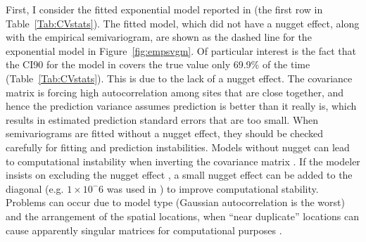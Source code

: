 \documentclass[11pt, titlepage]{article}\usepackage[]{graphicx}\usepackage[]{color}
\begin{document}
\begin{spacing}{1.9}
\begin{flushleft}
First, I consider the fitted exponential model reported in \citet{Ladl:Avga:Whea:Boyc:pred:2016} (the first row in Table~\ref{Tab:CVstats}).  The fitted model, which did not have a nugget effect, along with the empirical semivariogram, are shown as the dashed line for the exponential model in Figure~\ref{fig:empsvgm}.  Of particular interest is the fact that the CI90 for the model in \citet{Ladl:Avga:Whea:Boyc:pred:2016} covers the true value only 69.9\% of the time (Table~\ref{Tab:CVstats}). This is due to the lack of a nugget effect. The covariance matrix is forcing high autocorrelation among sites that are close together, and hence the prediction variance assumes prediction is better than it really is, which results in estimated prediction standard errors that are too small. When semivariograms are fitted without a nugget effect, they should be checked carefully for fitting and prediction instabilities. Models without nugget can lead to computational instability when inverting the covariance matrix \citep{Diam:Arms:robu:1984,Posa:cond:1989,ODow:cond:1991,Abab:cond:1994}. If the modeler insists on excluding the nugget effect \citep[as often occurs when using kriging to approximate deterministic computer models, e.g.][]{Mart:Simp:krig:2005}, a small nugget effect can be added to the diagonal (e.g. $1 \times 10^-6$ was used in \citet{Book:Denn:Fran:Sera:etal:rigo:1999}) to improve computational stability.  Problems can occur due to model type (Gaussian autocorrelation is the worst) and the arrangement of the spatial locations, when ``near duplicate'' locations can cause apparently singular matrices for computational purposes \citep[][p. 220]{Biva:Pebe:Gome:appl:2008}.


\end{flushleft}
\end{spacing}
\end{document}
